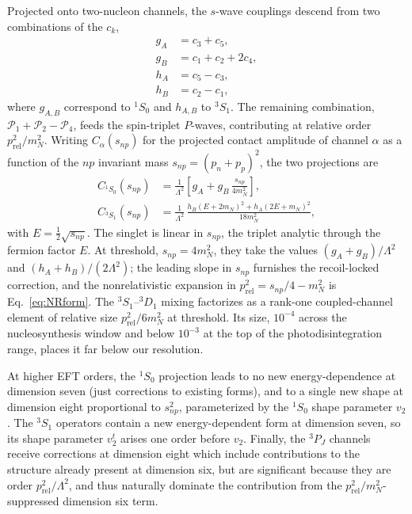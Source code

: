 \documentclass[
  aps,prd,twocolumn,nofootinbib,superscriptaddress,
  longbibliography,floatfix,preprintnumbers
]{revtex4-2}
\newcommand{\prel}{p_{\mathrm{rel}}}
\begin{document}
Projected onto two-nucleon channels, the $s$-wave couplings descend from two combinations of the $c_k$,
\begin{align}
  g_A &= c_3+c_5, \nonumber\\
  g_B &= c_1+c_2+2c_4, \nonumber\\
  h_A &= c_5-c_3, \nonumber\\
  h_B &= c_2-c_1,
  \label{eq:gAB}
\end{align}
where $g_{A,B}$ correspond to $^{1}S_{0}$ and $h_{A,B}$ to $^{3}S_{1}$.
The remaining combination, $\mathcal{P}_1+\mathcal{P}_2-\mathcal{P}_4$, feeds the spin-triplet $P$-waves, contributing at relative order $\prel^{2}/m_N^{2}$.
Writing $C_\alpha(s_{np})$ for the projected contact amplitude of channel
$\alpha$ as a function of the $np$ invariant mass $s_{np}=(p_n+p_p)^{2}$, the
two projections are
\begin{align}
  C_{^1S_0}(s_{np}) &= \frac{1}{\Lambda^{2}}
      \left[g_A + g_B\,\frac{s_{np}}{4m_N^{2}}\right],
  \label{eq:Csinglet}\\
  C_{^3S_1}(s_{np}) &= \frac{1}{\Lambda^{2}}\,
      \frac{h_B(E+2m_N)^{2}+h_A(2E+m_N)^{2}}{18m_N^{2}},
  \label{eq:Ctriplet}
\end{align}
with $E=\tfrac{1}{2}\sqrt{s_{np}}$. The singlet is linear in $s_{np}$, the
triplet analytic through the fermion factor $E$. At threshold, $s_{np}=4m_N^{2}$, they take the values $(g_A+g_B)/\Lambda^{2}$ and
$(h_A+h_B)/(2\Lambda^{2})$; the leading slope in $s_{np}$ furnishes the recoil-locked
correction, and the nonrelativistic expansion in $\prel^{2}=s_{np}/4-m_N^{2}$
is Eq.~\eqref{eq:NRform}.
The $^{3}S_{1}$--$^{3}D_{1}$ mixing factorizes as a rank-one coupled-channel element of relative size $\prel^{2}/6m_N^{2}$ at threshold. 
Its size, $10^{-4}$ across the nucleosynthesis window and below $10^{-3}$ at the top of the photodisintegration range, places it far below our resolution.

At higher EFT orders, the $^{1}S_{0}$ projection leads to no new energy-dependence at dimension seven (just corrections to existing forms),
and to a single new shape at dimension eight proportional to $s_{np}^{2}$, parameterized by the $^{1}S_{0}$ shape parameter $v_{2}$.
The $^{3}S_{1}$ operators contain a new energy-dependent form at dimension seven, so its shape parameter $v_{2}^{t}$ arises one order before $v_{2}$.
Finally, the $^{3}P_{J}$ channels receive corrections at dimension eight which include contributions to the structure already present at dimension six, but are significant
because they are order $\prel^{2}/\Lambda^{2}$, and thus naturally dominate the contribution from the $\prel^{2}/m_N^{2}$-suppressed dimension six term.
\end{document}
